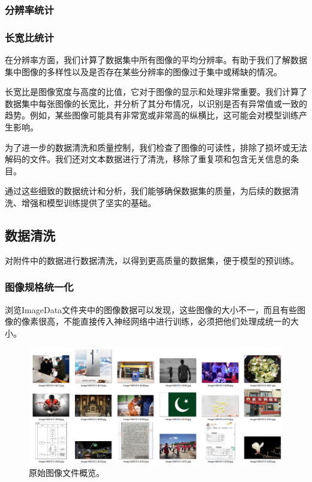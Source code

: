 \documentclass[a4paper]{zreport}
\begin{document}
\subsubsection{分辨率统计}

\subsubsection{长宽比统计}

在分辨率方面，我们计算了数据集中所有图像的平均分辨率。有助于我们了解数据集中图像的多样性以及是否存在某些分辨率的图像过于集中或稀缺的情况。

长宽比是图像宽度与高度的比值，它对于图像的显示和处理非常重要。我们计算了数据集中每张图像的长宽比，并分析了其分布情况，以识别是否有异常值或一致的趋势。例如，某些图像可能具有非常宽或非常高的纵横比，这可能会对模型训练产生影响。

为了进一步的数据清洗和质量控制，我们检查了图像的可读性，排除了损坏或无法解码的文件。我们还对文本数据进行了清洗，移除了重复项和包含无关信息的条目。

通过这些细致的数据统计和分析，我们能够确保数据集的质量，为后续的数据清洗、增强和模型训练提供了坚实的基础。

\subsection{数据清洗}
对附件中的数据进行数据清洗，以得到更高质量的数据集，便于模型的预训练。

\subsubsection{图像规格统一化}

浏览ImageData文件夹中的图像数据可以发现，这些图像的大小不一，而且有些图像的像素很高，不能直接传入神经网络中进行训练，必须把他们处理成统一的大小。

\begin{figure}[h]
\centering
\includegraphics[width=0.95\linewidth]{figures/raw_image}
\caption{原始图像文件概览。}
\label{fig:rawimage}
\end{figure}
\end{document}
